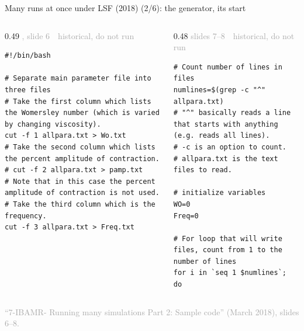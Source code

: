 \documentclass[aspectratio=169,11pt]{beamer}
\newcommand{\sourcecredit}[1]{\vfill\begin{flushright}\tiny\textcolor{DarkGray}{#1}\end{flushright}}
\newcommand{\hist}[1]{{\tiny\sffamily\textcolor{DarkGray}{#1\ \textbullet\ historical, do not run}}\par\nointerlineskip\vspace{0.3mm}}
\begin{document}
\begin{frame}[fragile]{Many runs at once under LSF (2018) (2/6): the generator, its start}
\label{fr:sweep2}
\begin{columns}[T,onlytextwidth]
\begin{column}{0.49\textwidth}
\hist{, slide 6}
\begin{lstlisting}[style=hist]
#!/bin/bash

# Separate main parameter file into three files
# Take the first column which lists the Womersley number (which is varied by changing viscosity).
cut -f 1 allpara.txt > Wo.txt
# Take the second column which lists the percent amplitude of contraction.
# cut -f 2 allpara.txt > pamp.txt
# Note that in this case the percent amplitude of contraction is not used.
# Take the third column which is the frequency.
cut -f 3 allpara.txt > Freq.txt
\end{lstlisting}
\end{column}
\begin{column}{0.48\textwidth}
\hist{slides 7--8}
\begin{lstlisting}[style=hist]
# Count number of lines in files
numlines=$(grep -c "^" allpara.txt)
# "^" basically reads a line that starts with anything (e.g. reads all lines).
# -c is an option to count.
# allpara.txt is the text files to read.

# initialize variables
WO=0
Freq=0

# For loop that will write files, count from 1 to the number of lines
for i in `seq 1 $numlines`;
do
\end{lstlisting}
\end{column}
\end{columns}
\sourcecredit{``7-IBAMR- Running many simulations Part 2: Sample code'' (March 2018), slides 6--8.}
\end{frame}
\end{document}
